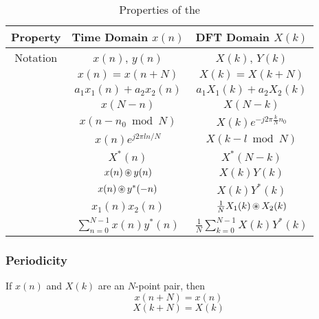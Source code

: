 \begin{table}[h!]
  \centering
  \begin{tabular}{ccc}
    \toprule
    Property & Time Domain $x(n)$ & DFT Domain $X(k)$ \\
    \midrule
    Notation & $x(n)$, $y(n)$ & $X(k)$, $Y(k)$ \\
    \nameref{subsubsec:DFT_Properties-Periodicity} & $x(n) = x(n+N)$ & $X(k) = X(k+N)$ \\
    \nameref{subsubsec:DFT_Properties-Linearity} & $a_{1}x_{1}(n) + a_{2}x_{2}(n)$ & $a_{1}X_{1}(k) + a_{2}X_{2}(k)$ \\
    \nameref{subsubsec:DFT_Properties-Time_Reversal} & $x(N-n)$ & $X(N-k)$ \\
    \nameref{subsubsec:DFT_Properties-Circular_Time_Shifting} & $x(n - n_{0} \bmod N)$ & $X(k) e^{-j 2\pi \frac{k}{N} n_{0}} $ \\
    \nameref{subsubsec:DFT_Properties-Circular_Frequency_Shift} & $x(n)e^{j2\pi l n/N}$ & $X(k-l \bmod N)$ \\
    \nameref{subsubsec:DFT_Properties-Complex_Conjugate} & $X^{*}(n)$ & $X^{*}(N-k)$ \\
    \nameref{subsubsec:DFT_Properties-Circular_Convolution} & $x(n) \operatorname{\circledast} y(n)$ & $X(k)Y(k)$ \\
    \nameref{subsubsec:DFT_Properties-Circular_Correlation} & $x(n) \operatorname{\circledast} y^{*}(-n)$ & $X(k)Y^{*}(k)$ \\
    \nameref{subsubsec:DFT_Properties-2_Sequence_Multiplication} & $x_{1}(n)x_{2}(n)$ & $\frac{1}{N} X_{1}(k) \operatorname{\circledast} X_{2}(k)$ \\
    \nameref{subsubsec:DFT_Properties-Parsevals_Theorem} & $\sum\limits_{n=0}^{N-1} x(n) y^{*}(n)$ & $\frac{1}{N} \sum\limits_{k=0}^{N-1} X(k)Y^{*}(k)$ \\
    \bottomrule
  \end{tabular}
  \caption{Properties of the }
  \label{tab:DFT_Properties}
\end{table}

\subsubsection{Periodicity}\label{subsubsec:DFT_Properties-Periodicity}
If $x(n)$ and $X(k)$ are an $N$-point  pair, then
\begin{equation}\label{eq:DFT_Properties-Periodicity-Time}
  x(n+N) = x(n)
\end{equation}
\begin{equation}\label{eq:DFT_Properties-Periodicity-Frequency}
  X(k+N) = X(k)
\end{equation}

